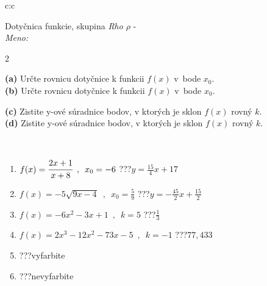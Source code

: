 \documentclass[10pt]{report}
\begin{document}
\begin{tabular}{c:c}
\begin{minipage}[c][104.5mm][t]{0.5\linewidth}
\begin{center}
\vspace{7mm}
{\huge Dotyčnica funkcie, skupina \textit{Rho $\rho$} -}\\[5mm]
\textit{Meno:}\phantom{xxxxxxxxxxxxxxxxxxxxxxxxxxxxxxxxxxxxxxxxxxxxxxxxxxxxxxxxxxxxxxxxx}\\[5mm]
\begin{minipage}{0.95\linewidth}
\begin{center}
{\small \begin{multicols}{2} \raggedright
\textbf{(a)} Určte rovnicu dotyčnice k funkcii \(f(x)\) v~bode \(x_0\). \\[1mm]
\textbf{(b)} Určte rovnicu dotyčnice k funkcii \(f(x)\) v~bode \(x_0\). \par \columnbreak
\textbf{(c)} Zistite y-ové súradnice bodov, v ktorých je sklon \(f(x)\) rovný \(k\). \\[1mm]
\textbf{(d)} Zistite y-ové súradnice bodov, v ktorých je sklon \(f(x)\) rovný \(k\). \\[1mm]
\end{multicols}
}
\end{center}
\end{minipage}
\\[4mm]
\begin{minipage}{0.79\linewidth}
\begin{center}
\begin{varwidth}{\linewidth}
\begin{enumerate}
\normalsizerr
\item $f(x)=\cfrac{2x+1}{x+8}\enspace , \enspace x_0=-6$\quad \dotfill\; ???\;\dotfill \quad $y = \frac{15}{4}x+17$
\item $f(x)=-5\sqrt{9x-4}\enspace , \enspace x_0=\frac{5}{9}$\quad \dotfill\; ???\;\dotfill \quad $y = -\frac{45}{2}x+\frac{15}{2}$
\item $f(x)=-6x^2-3x+1\enspace , \enspace k=5$\quad \dotfill\; ???\;\dotfill \quad $\frac{1}{3}$
\item $f(x)=2x^3-12x^2-73x-5\enspace , \enspace k=-1$\quad \dotfill\; ???\;\dotfill \quad $77 , 433$
\item \quad \dotfill\; ???\;\dotfill \quad vyfarbite
\item \quad \dotfill\; ???\;\dotfill \quad nevyfarbite
\end{enumerate}
\end{varwidth}

\end{center}
\end{minipage}
\end{center}
\end{minipage}
\end{tabular}
\end{document}
